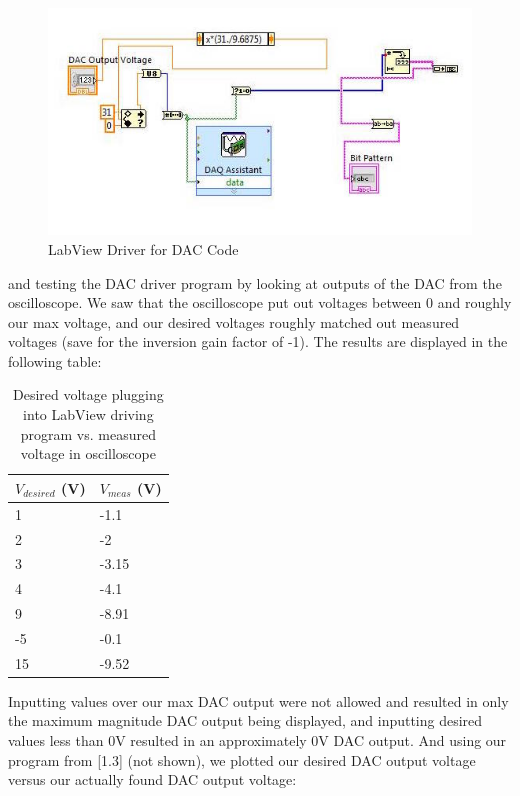 \documentclass{article}
\begin{document}
    \begin{figure}[H]
        \centering
        \includegraphics[scale = 0.5]{2b.jpeg}
        \caption{LabView Driver for DAC Code \cite{lab10}}
        \label{fig:my_label}
    \end{figure}
    and testing the DAC driver program by looking at outputs of the DAC from the oscilloscope. We saw that the oscilloscope put out voltages between 0 and roughly our max voltage, and our desired voltages roughly matched out measured voltages (save for the inversion gain factor of -1). The results are displayed in the following table: 
    \begin{table}[H]
        \centering
        \caption{Desired voltage plugging into LabView driving program vs. measured voltage in oscilloscope}
        \label{my-label}
        \begin{tabular}{ll}
        \textbf{$V_{desired}$ (V)} & \textbf{$V_{meas}$ (V)} \\ \hline
        1 & -1.1 \\
        2 & -2 \\
        3 & -3.15 \\
        4 & -4.1 \\
        9 & -8.91 \\
        -5 & -0.1 \\
        15 & -9.52
        \end{tabular}
        \end{table}
    Inputting values over our max DAC output were not allowed and resulted in only the maximum magnitude DAC output being displayed, and inputting desired values less than 0V resulted in an approximately 0V DAC output. And using our program from [1.3] (not shown), we plotted our desired DAC output voltage versus our actually found DAC output voltage:
\end{document}

